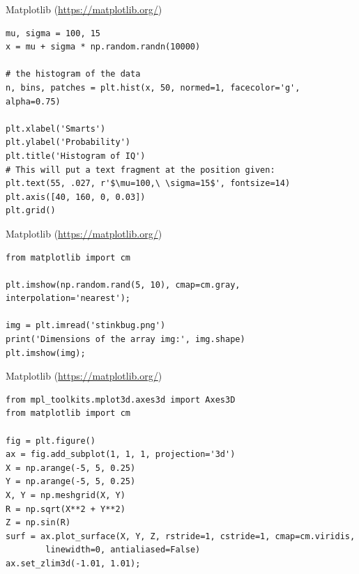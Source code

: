 \documentclass{beamer}
\begin{document}
\begin{frame}[fragile]{Matplotlib (\url{https://matplotlib.org/})}
\begin{lstlisting}
mu, sigma = 100, 15
x = mu + sigma * np.random.randn(10000)

# the histogram of the data
n, bins, patches = plt.hist(x, 50, normed=1, facecolor='g', alpha=0.75)

plt.xlabel('Smarts')
plt.ylabel('Probability')
plt.title('Histogram of IQ')
# This will put a text fragment at the position given:
plt.text(55, .027, r'$\mu=100,\ \sigma=15$', fontsize=14)
plt.axis([40, 160, 0, 0.03])
plt.grid()
\end{lstlisting}
\end{frame}

\begin{frame}[fragile]{Matplotlib (\url{https://matplotlib.org/})}
\begin{lstlisting}
from matplotlib import cm

plt.imshow(np.random.rand(5, 10), cmap=cm.gray, interpolation='nearest');

img = plt.imread('stinkbug.png')
print('Dimensions of the array img:', img.shape)
plt.imshow(img);
\end{lstlisting}
\end{frame}


\begin{frame}[fragile]{Matplotlib (\url{https://matplotlib.org/})}
\begin{lstlisting}
from mpl_toolkits.mplot3d.axes3d import Axes3D
from matplotlib import cm

fig = plt.figure()
ax = fig.add_subplot(1, 1, 1, projection='3d')
X = np.arange(-5, 5, 0.25)
Y = np.arange(-5, 5, 0.25)
X, Y = np.meshgrid(X, Y)
R = np.sqrt(X**2 + Y**2)
Z = np.sin(R)
surf = ax.plot_surface(X, Y, Z, rstride=1, cstride=1, cmap=cm.viridis,
        linewidth=0, antialiased=False)
ax.set_zlim3d(-1.01, 1.01);
\end{lstlisting}
\end{frame}



\end{document}

